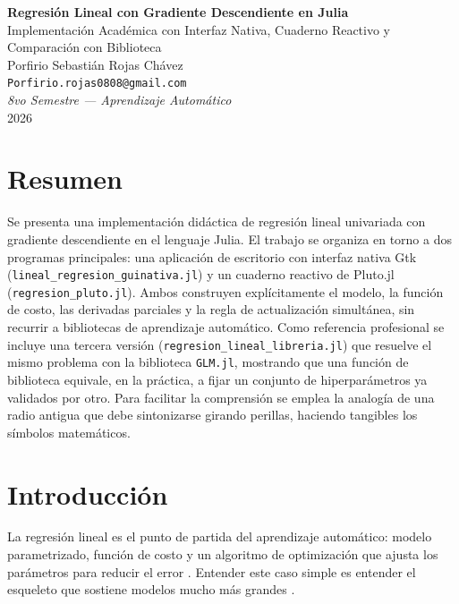 \documentclass[11pt,a4paper]{article}
\begin{document}
\begin{center}
  {\LARGE \textbf{Regresi\'on Lineal con Gradiente Descendiente en Julia}}\\[0.3em]
  {\large Implementaci\'on Acad\'emica con Interfaz Nativa, Cuaderno Reactivo y Comparaci\'on con Biblioteca}\\[1em]
  Porfirio Sebasti\'an Rojas Ch\'avez\\
  \texttt{Porfirio.rojas0808@gmail.com}\\
  \textit{8vo Semestre --- Aprendizaje Autom\'atico}\\
  2026
\end{center}

\vspace{1em}

\section*{Resumen}

Se presenta una implementaci\'on did\'actica de regresi\'on lineal univariada con gradiente descendiente en el lenguaje Julia. El trabajo se organiza en torno a dos programas principales: una aplicaci\'on de escritorio con interfaz nativa Gtk (\texttt{lineal\_regresion\_guinativa.jl}) y un cuaderno reactivo de Pluto.jl (\texttt{regresion\_pluto.jl}). Ambos construyen expl\'icitamente el modelo, la funci\'on de costo, las derivadas parciales y la regla de actualizaci\'on simult\'anea, sin recurrir a bibliotecas de aprendizaje autom\'atico. Como referencia profesional se incluye una tercera versi\'on (\texttt{regresion\_lineal\_libreria.jl}) que resuelve el mismo problema con la biblioteca \texttt{GLM.jl}, mostrando que una funci\'on de biblioteca equivale, en la pr\'actica, a fijar un conjunto de hiperpar\'ametros ya validados por otro. Para facilitar la comprensi\'on se emplea la analog\'ia de una radio antigua que debe sintonizarse girando perillas, haciendo tangibles los s\'imbolos matem\'aticos.

\section{Introducci\'on}

La regresi\'on lineal es el punto de partida del aprendizaje autom\'atico: modelo parametrizado, funci\'on de costo y un algoritmo de optimizaci\'on que ajusta los par\'ametros para reducir el error \cite{ng2022ml}. Entender este caso simple es entender el esqueleto que sostiene modelos mucho m\'as grandes \cite{goodfellow2016deep}.
\end{document}
